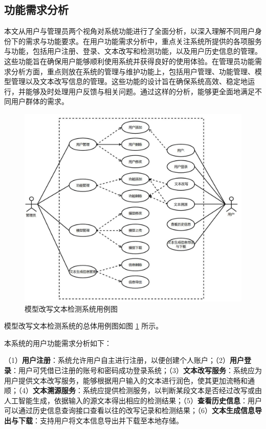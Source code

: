 \subsection{功能需求分析}
\label{sec:sys-func-need}

本文从用户与管理员两个视角对系统功能进行了全面分析，以深入理解不同用户身份下的需求与功能要求。在用户功能需求分析中，重点关注系统所提供的各项服务与功能，包括用户注册、登录、文本改写和检测功能，以及用户历史信息的管理。这些功能旨在确保用户能够顺利使用系统并获得良好的使用体验。在管理员功能需求分析方面，重点则放在系统的管理与维护功能上，包括用户管理、功能管理、模型管理以及文本改写信息的管理。这些功能的设计旨在确保系统高效、稳定地运行，并能够及时处理用户反馈与相关问题。通过这样的分析，能够更全面地满足不同用户群体的需求。

\begin{figure}[htb]
    \centering
    \includegraphics[width=\textwidth]{figures/sys-use-case.jpg}
    \caption{模型改写文本检测系统用例图}
    \label{fig:sys-use-case}
\end{figure}

模型改写文本检测系统的总体用例图如图 \ref{fig:sys-use-case} 所示。

本系统的用户功能需求分析如下：

（1）\textbf{用户注册}：系统允许用户自主进行注册，以便创建个人账户；（2）\textbf{用户登录}：用户可凭借已注册的账号和密码成功登录系统；（3）\textbf{文本改写服务}：系统应为用户提供文本改写服务，能够根据用户输入的文本进行润色，使其更加流畅和通顺；（4）\textbf{文本溯源服务}：系统应提供检测服务，以判断某段文本是否经过改写或由人工智能生成，依据输入的源文本得出相应的检测结果；（5）\textbf{查看历史信息}：用户可以通过历史信息查询接口查看以往的改写记录和检测结果；（6）\textbf{文本生成信息导出与下载}：支持用户将文本信息导出并下载至本地存储。


